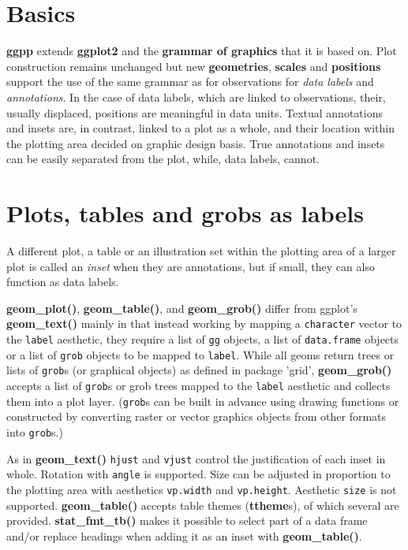 \documentclass[DIV=21,a3,landscape,9pt]{scrartcl}\usepackage[]{graphicx}\usepackage[]{xcolor}
\begin{document}
\begin{multicols}{3}

\section*{Basics}

\textbf{ggpp} extends \textbf{ggplot2} and the \textbf{grammar of graphics} that it is based on. Plot construction remains unchanged but new \textbf{geometries}, \textbf{scales} and \textbf{positions} support the use of the same grammar as for observations for \emph{data labels} and \emph{annotations}. In the case of data labels, which are linked to observations, their, usually displaced, positions are meaningful in data units. Textual annotations and insets are, in contrast, linked to a plot as a whole, and their location within the plotting area decided on graphic design basis. True annotations and insets can be easily separated from the plot, while, data labels, cannot.



\section*{Plots, tables and grobs as labels}

A different plot, a table or an illustration set within the plotting area of a larger plot is called an \textsl{inset} when they are annotations, but if small, they can also function as data labels.

\textbf{geom\_plot()}, \textbf{geom\_table()}, and \textbf{geom\_grob()} differ from ggplot's \textbf{geom\_text()} mainly in that instead working by mapping a \texttt{character} vector to the \texttt{label} aesthetic, they require a list of \texttt{gg} objects, a list of \texttt{data.frame} objects or a list of \texttt{grob} objects to be mapped to \texttt{label}. While all geoms return trees or lists of \texttt{grob}s (or graphical objects) as defined in package 'grid', \textbf{geom\_grob()} accepts a list of \texttt{grob}s or grob trees mapped to the \texttt{label} aesthetic and collects them into a plot layer. (\texttt{grob}s can be built in advance using drawing functions or constructed by converting raster or vector graphics objects from other formats into \texttt{grob}s.)

As in \textbf{geom\_text()} \texttt{hjust} and \texttt{vjust} control the justification of each inset in whole. Rotation with \texttt{angle} is supported. Size can be adjusted in proportion to the plotting area with aesthetics \texttt{vp.width} and \texttt{vp.height}. Aesthetic \texttt{size} is not supported. \textbf{geom\_table()} accepts table themes (\textbf{ttheme}s), of which several are provided. \textbf{stat\_fmt\_tb()} makes it possible to select part of a data frame and/or replace headings when adding it as an inset with \textbf{geom\_table()}.\vspace{1ex}


\end{multicols}
\end{document}
